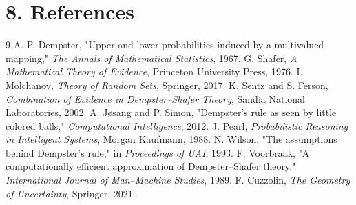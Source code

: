 \section*{8. References}


\begin{thebibliography}{9}
 A. P. Dempster, "Upper and lower probabilities induced by a multivalued mapping," \emph{The Annals of Mathematical Statistics}, 1967.
 G. Shafer, \emph{A Mathematical Theory of Evidence}, Princeton University Press, 1976.
 I. Molchanov, \emph{Theory of Random Sets}, Springer, 2017.
 K. Sentz and S. Ferson, \emph{Combination of Evidence in Dempster--Shafer Theory}, Sandia National Laboratories, 2002.
 A. Jøsang and P. Simon, "Dempster's rule as seen by little colored balls," \emph{Computational Intelligence}, 2012.
 J. Pearl, \emph{Probabilistic Reasoning in Intelligent Systems}, Morgan Kaufmann, 1988.
 N. Wilson, "The assumptions behind Dempster's rule," in \emph{Proceedings of UAI}, 1993.
 F. Voorbraak, "A computationally efficient approximation of Dempster--Shafer theory," \emph{International Journal of Man--Machine Studies}, 1989.
 F. Cuzzolin, \emph{The Geometry of Uncertainty}, Springer, 2021.
\end{thebibliography}
